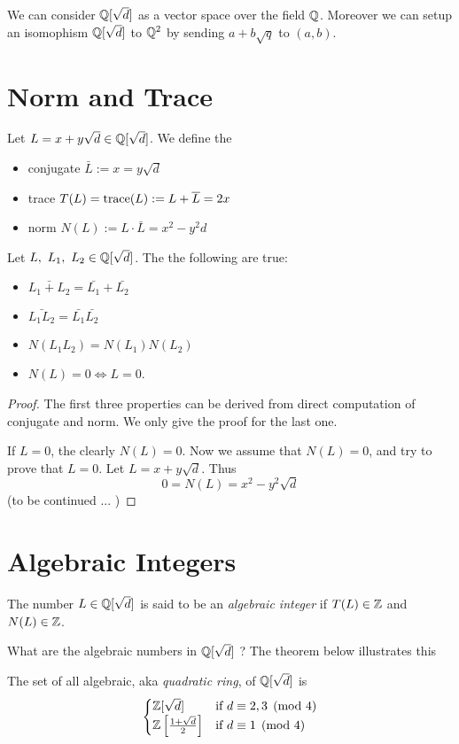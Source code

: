 We can consider $\Q[\sqrt d]$ as a vector space over the field $\Q$.
Moreover we can setup an isomophism $\Q[\sqrt d]$ to $\Q^2$ by sending
$a+b\sqrt q$ to $(a,b)$.


\section{Norm and Trace}
Let $L=x+y\sqrt d\in\Q[\sqrt d]$. We define the
\begin{itemize}
  \item conjugate $\bar{L}:=x=y\sqrt d$
  \item trace $T(L)=\operatorname{trace}(L):=L+\overline{L}=2x$
  \item norm $N(L):=L\cdot\bar{L}=x^2-y^2d$
\end{itemize}
\begin{proposition}
  Let $L,~L_1,~L_2\in\Q[\sqrt d]$. The the following are true:
  \begin{itemize}
    \item $\bar{L_1+L_2}=\bar{L_1}+\bar{L_2}$
    \item $\bar{L_1L_2}=\bar{L_1}\bar{L_2}$
    \item $N(L_1L_2)=N(L_1)N(L_2)$
    \item $N(L)=0\iff L=0$.
  \end{itemize}
\end{proposition}
\begin{proof}
  The first three properties can be derived from direct computation
  of conjugate and norm. We only give the proof for the last one.

  If $L=0$, the clearly $N(L)=0$. Now we assume that $N(L)=0$, and
  try to prove that $L=0$. Let $L=x+y\sqrt d$. Thus
  \[0=N(L)=x^2-y^2\sqrt d\]
  (to be continued ... )
\end{proof}

\newpage
\section{Algebraic Integers}
\begin{definition}
  The number $L\in\Q[\sqrt d]$ is said to be an 
  \emph{algebraic integer} if $T(L)\in\Z$
  and $N(L)\in\Z$.
\end{definition}
What are the algebraic numbers in $\Q[\sqrt d]$ ?
The theorem below illustrates this
\begin{theorem}
  The set of all algebraic, aka \emph{quadratic ring}, of
  $\Q[\sqrt d]$ is
  \[
  \begin{cases}
    \Z[\sqrt d] &\text{if } d\equiv 2,3 \pmod{4}\\
    \Z\left[\frac{1+\sqrt d}{2}\right] &\text{if }d\equiv 1\pmod{4}
  \end{cases}
  \]
\end{theorem}

